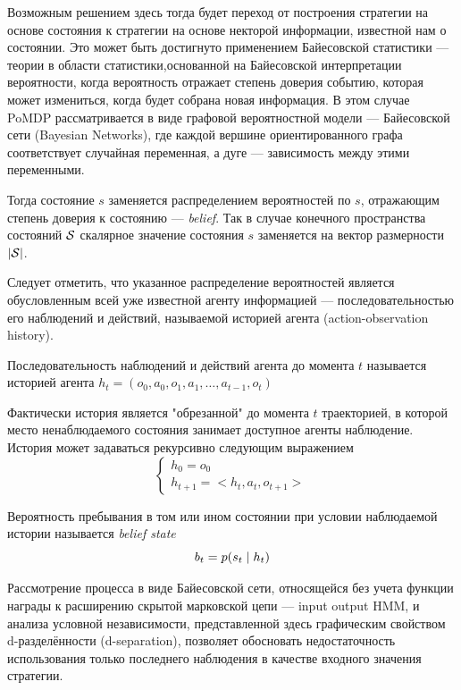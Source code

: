 \documentclass[../main.tex]{subfiles}
\begin{document}
Возможным решением здесь тогда будет переход от построения стратегии на основе состояния к стратегии на основе некторой информации, известной нам о состоянии.
Это может быть достигнуто применением Байесовской статистики --- теории в области статистики,основанной на Байесовской интерпретации вероятности, когда вероятность отражает степень доверия событию, которая может измениться, когда будет собрана новая информация. В этом случае PoMDP рассматривается в виде графовой вероятностной  модели --- Байесовской сети (Bayesian Networks), где каждой вершине ориентированного графа соответствует случайная переменная, а дуге --- зависимость между этими переменными. 

  
Тогда состояние  $s$ заменяется распределением вероятностей по $s$, отражающим степень доверия к состоянию --- \emph{belief}. Так в случае конечного пространства состояний $\mathcal{S}$ скалярное значение состояния $s$ заменяется на вектор размерности  $|\mathcal{S}|$. 

Следует отметить, что указанное распределение вероятностей является обусловленным всей уже известной агенту информацией --- последовательностью его наблюдений и действий,  называемой историей агента (action-observation history). 

\begin{definition}
	Последовательность наблюдений и действий агента до момента $t$ называется историей агента
	$h_t = (o_0, a_0, o_1, a_1, \dots ,a_{t-1}, o_t)$
\end{definition}

Фактически история является "обрезанной" до момента $t$ траекторией, в которой место ненаблюдаемого состояния занимает доступное агенты наблюдение. История может задаваться рекурсивно следующим выражением
\begin{equation}
\label{update_history}
\begin{cases}
h_0 = o_0 \\
h_{t+1} = <h_{t}, a_{t}, o_{t+1}>
\end{cases}
\end{equation}

\begin{definition}
	Вероятность пребывания в том или ином состоянии при условии наблюдаемой истории  называется \emph{belief state} 
	$$b_t = p(s_t \HM\mid h_{t})$$
	\end{definition}

	Рассмотрение процесса в виде Байесовской сети, относящейся без учета функции награды к расширению скрытой марковской цепи  --- input output HMM, и анализа условной независимости, представленной здесь графическим свойством d-разделённости (d-separation), позволяет обосновать недостаточность использования только последнего наблюдения в качестве входного значения стратегии. 
\end{document}

